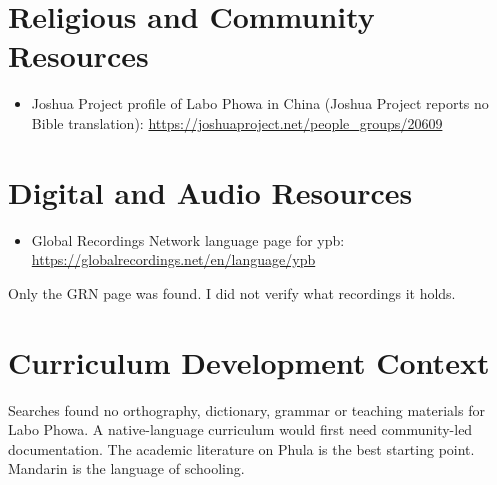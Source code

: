\documentclass[12pt]{article}
\begin{document}
\section{Religious and Community Resources}
\begin{itemize}
\item Joshua Project profile of Labo Phowa in China (Joshua Project reports no Bible translation): \url{https://joshuaproject.net/people_groups/20609}
\end{itemize}

\section{Digital and Audio Resources}
\begin{itemize}
\item Global Recordings Network language page for ypb: \url{https://globalrecordings.net/en/language/ypb}
\end{itemize}
Only the GRN page was found. I did not verify what recordings it holds.

\section{Curriculum Development Context}
Searches found no orthography, dictionary, grammar or teaching materials for Labo Phowa. A native-language curriculum would first need community-led documentation. The academic literature on Phula is the best starting point. Mandarin is the language of schooling.
\end{document}
